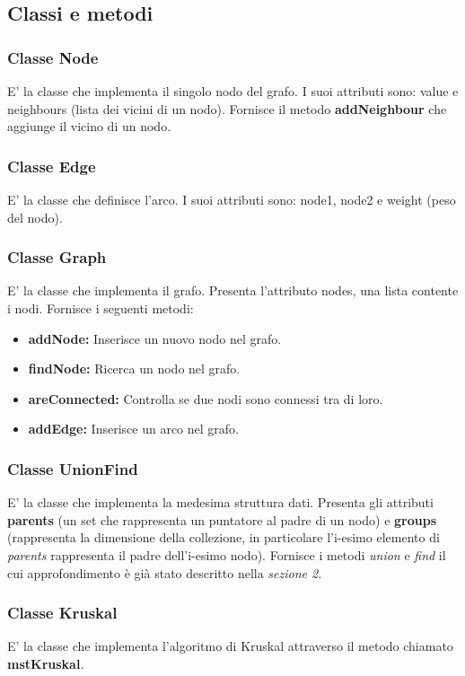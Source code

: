 \documentclass{article}
\begin{document}
\subsection{Classi e metodi}
\subsubsection{Classe Node}
E' la classe che implementa il singolo nodo del grafo.
I suoi attributi sono: value e neighbours (lista dei vicini di un nodo).
Fornisce il metodo \textbf{addNeighbour} che aggiunge il vicino di un nodo.

\subsubsection{Classe Edge}
E' la classe che definisce l'arco.
I suoi attributi sono: node1, node2 e weight (peso del nodo).

\subsubsection{Classe Graph}
E' la classe che implementa il grafo.
Presenta l'attributo nodes, una lista contente i nodi. 
Fornisce i seguenti metodi:
\begin{itemize}
    \item \textbf{addNode:} Inserisce un nuovo nodo nel grafo.
    \item \textbf{findNode:} Ricerca un nodo nel grafo.
    \item \textbf{areConnected:} Controlla se due nodi sono connessi tra di loro.
    \item \textbf{addEdge:} Inserisce un arco nel grafo.
\end{itemize}

\subsubsection{Classe UnionFind}
E' la classe che implementa la medesima struttura dati.
Presenta gli attributi \textbf{parents} (un set che rappresenta un puntatore al padre di un nodo) e \textbf{groups} (rappresenta la dimensione della collezione, in particolare l'i-esimo elemento di \textit{parents} rappresenta il padre dell'i-esimo nodo).
Fornisce i metodi \textit{union} e \textit{find} il cui approfondimento è già stato descritto nella \textit{sezione 2}.

\subsubsection{Classe Kruskal}
E' la classe che implementa l'algoritmo di Kruskal attraverso il metodo chiamato \textbf{mstKruskal}.
\end{document}

